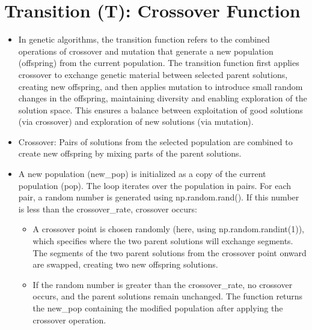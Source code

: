 \documentclass[
  letterpaper,
  DIV=11,
  numbers=noendperiod]{scrreprt}
\providecommand{\tightlist}{%
  \setlength{\itemsep}{0pt}\setlength{\parskip}{0pt}}\usepackage{longtable,booktabs,array}
\begin{document}
\section{Transition (T): Crossover
Function}\label{transition-t-crossover-function}

\begin{itemize}
\item
  In genetic algorithms, the transition function refers to the combined
  operations of crossover and mutation that generate a new population
  (offspring) from the current population. The transition function first
  applies crossover to exchange genetic material between selected parent
  solutions, creating new offspring, and then applies mutation to
  introduce small random changes in the offspring, maintaining diversity
  and enabling exploration of the solution space. This ensures a balance
  between exploitation of good solutions (via crossover) and exploration
  of new solutions (via mutation).
\item
  Crossover: Pairs of solutions from the selected population are
  combined to create new offspring by mixing parts of the parent
  solutions.
\item
  A new population (new\_pop) is initialized as a copy of the current
  population (pop). The loop iterates over the population in pairs. For
  each pair, a random number is generated using np.random.rand(). If
  this number is less than the crossover\_rate, crossover occurs:

  \begin{itemize}
  \tightlist
  \item
    A crossover point is chosen randomly (here, using
    np.random.randint(1)), which specifies where the two parent
    solutions will exchange segments. The segments of the two parent
    solutions from the crossover point onward are swapped, creating two
    new offspring solutions.
  \item
    If the random number is greater than the crossover\_rate, no
    crossover occurs, and the parent solutions remain unchanged. The
    function returns the new\_pop containing the modified population
    after applying the crossover operation.
  \end{itemize}
\end{itemize}
\end{document}
